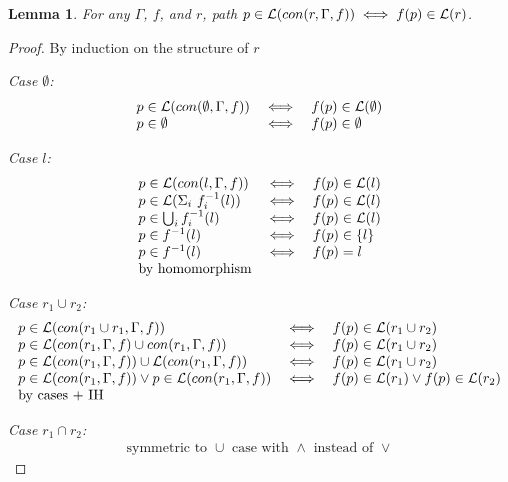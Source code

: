 \documentclass[twocolumn, openany]{sig-alternate-10pt}
\newtheorem{lem}[thm]{Lemma}
\begin{document}
\vspace{1em}
\begin{lem}
  For any $\Gamma$, $f$, and $r$, path $p \in \mathcal{L}(con(r,\Gamma,f)) \iff f(p) \in \mathcal{L}(r)$.
\end{lem}
\begin{proof}
By induction on the structure of $r$

\emph{Case $\emptyset$:}
  \[ \begin{array}{lll}
    p \in \mathcal{L}(con(\emptyset,\Gamma,f)) &\iff& f(p) \in \mathcal{L}(\emptyset) \\
    p \in \emptyset &\iff& f(p) \in \emptyset \\
  \end{array} \]

\emph{Case $l$:}
  \[ \begin{array}{lll}
    p \in \mathcal{L}(con(l,\Gamma,f)) &\iff& f(p) \in \mathcal{L}(l) \\
    p \in \mathcal{L}(\Sigma_i ~ f_i^{-1}(l)) &\iff& f(p) \in \mathcal{L}(l) \\
    p \in \bigcup_i f_i^{-1}(l) &\iff& f(p) \in \mathcal{L}(l) \\
    p \in f^{-1}(l) &\iff& f(p) \in \{ l \} \\
    p \in f^{-1}(l) &\iff& f(p) = l \\
    \text{by homomorphism} & & \\
  \end{array} \]

\emph{Case $r_1 \cup r_2$:}
  \[ \begin{array}{lll}
    p \in \mathcal{L}(con(r_1 \cup r_1,\Gamma,f)) &\iff& f(p) \in \mathcal{L}(r_1 \cup r_2) \\
    p \in \mathcal{L}(con(r_1,\Gamma,f) \cup con(r_1,\Gamma,f)) &\iff& f(p) \in \mathcal{L}(r_1 \cup r_2) \\
    p \in \mathcal{L}(con(r_1,\Gamma,f)) \cup \mathcal{L}(con(r_1,\Gamma,f)) &\iff& f(p) \in \mathcal{L}(r_1 \cup r_2) \\
    p \in \mathcal{L}(con(r_1,\Gamma,f)) \vee p \in \mathcal{L}(con(r_1,\Gamma,f)) 
       &\iff& 
       f(p) \in \mathcal{L}(r_1) \vee f(p) \in \mathcal{L}(r_2) \\
    \text{by cases + IH} & & \\
  \end{array} \]

\emph{Case $r_1 \cap r_2$:} 
  \[ \begin{array}{c}
    \text{symmetric to } \cup \text{ case with } \wedge \text{ instead of } \vee
  \end{array} \]


\end{proof}
\end{document}
